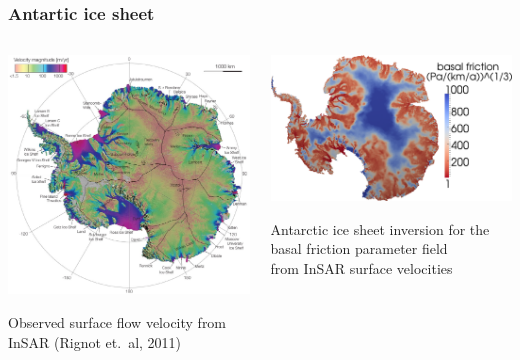 \documentclass[10pt,final,xcolor=dvipsnames]{beamer}
\begin{document}
\begin{frame}
	\frametitle{Antartic ice sheet}
	
	\vspace{0.2in}
	\begin{columns}
		\begin{column}{0.49\paperwidth}
			\centering\includegraphics[width=0.7\columnwidth]{ScienceRignot-crop.pdf}
			\vspace{-0.2in}
			\begin{center}
				{\tiny Observed surface flow velocity from InSAR (Rignot et.\ al, 2011)}
			\end{center}
		\end{column}
		\hspace{-0.4in}
		\begin{column}{0.49\paperwidth}
			\vspace{0.1in}
			\centering\includegraphics[width=0.85\columnwidth]{beta_cube_cut.png}
			\vspace{-0.1in}
			\begin{center}
				{\tiny Antarctic ice sheet inversion for the basal friction
					parameter field \\
					\vspace{-0.1in}
					from InSAR surface velocities}
			\end{center}
		\end{column}
	\end{columns}
	

\end{frame}
\end{document}
